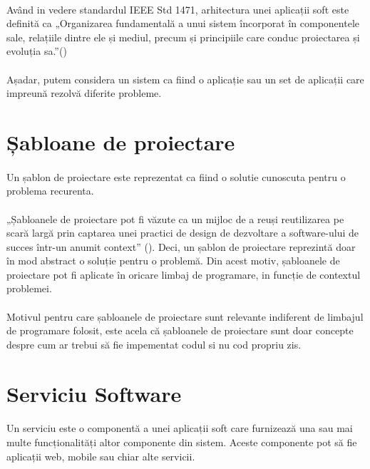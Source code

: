 \documentclass[12pt]{report}
\begin{document}
  	\paragraph{}Având in vedere standardul IEEE Std 1471, arhitectura unei aplicații soft este definită ca „Organizarea fundamentală a unui sistem încorporat în componentele sale, relațiile dintre ele și mediul, precum și principiile care conduc proiectarea și evoluția sa.”(\cite{hilliard2000ieee})
  	\paragraph{}Așadar, putem considera un sistem ca fiind o aplicație sau un set de aplicații care impreună rezolvă diferite probleme.
  \section{Șabloane de proiectare}
  \paragraph{}Un șablon de proiectare este reprezentat ca fiind o solutie cunoscuta pentru o problema recurenta.
    \paragraph{}„Șabloanele de proiectare pot fi văzute ca un mijloc de a reuși reutilizarea pe scară largă prin captarea unei practici de design de dezvoltare a software-ului de succes într-un anumit context” (\cite{alencar1996formal}).
  Deci, un șablon de proiectare reprezintă doar în mod abstract o soluție pentru o problemă. Din acest motiv, șabloanele de proiectare pot fi aplicate în oricare limbaj de programare, in funcție de contextul problemei.
  \paragraph{}Motivul pentru care șabloanele de proiectare sunt relevante indiferent de limbajul de programare folosit, este acela că șabloanele de proiectare sunt doar concepte despre cum ar trebui să fie impementat codul si nu cod propriu zis.
  \section{Serviciu Software}
  \paragraph{}
  Un serviciu este o componentă a unei aplicații soft care furnizează una sau mai multe funcționalități altor componente din sistem. Aceste componente pot să fie aplicații web, mobile sau chiar alte servicii.
\end{document}
